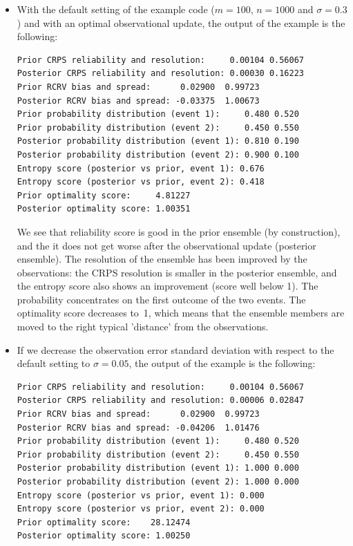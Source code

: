 \documentclass[11pt]{article}
\begin{document}
\begin{itemize}
\item
With the default setting of the example code
($m=100$, $n=1000$ and $\sigma=0.3$)
and with an optimal observational update,
the output of the example is the following:

\begin{verbatim}
Prior CRPS reliability and resolution:     0.00104 0.56067
Posterior CRPS reliability and resolution: 0.00030 0.16223
Prior RCRV bias and spread:      0.02900  0.99723
Posterior RCRV bias and spread: -0.03375  1.00673
Prior probability distribution (event 1):     0.480 0.520
Prior probability distribution (event 2):     0.450 0.550
Posterior probability distribution (event 1): 0.810 0.190
Posterior probability distribution (event 2): 0.900 0.100
Entropy score (posterior vs prior, event 1): 0.676
Entropy score (posterior vs prior, event 2): 0.418
Prior optimality score:     4.81227
Posterior optimality score: 1.00351
\end{verbatim}

We see that reliability score is good in the prior ensemble (by construction),
and the it does not get worse after the observational update (posterior ensemble).
The resolution of the ensemble has been improved by the observations:
the CRPS resolution is smaller in the posterior ensemble,
and the entropy score also shows an improvement (score well below 1).
The probability concentrates on the first outcome of the two events.
The optimality score decreases to~1, which means that the ensemble members
are moved to the right typical 'distance' from the observations.

\item
If we decrease the observation error standard deviation
with respect to the default setting to $\sigma=0.05$,
the output of the example is the following:

\begin{verbatim}
Prior CRPS reliability and resolution:     0.00104 0.56067
Posterior CRPS reliability and resolution: 0.00006 0.02847
Prior RCRV bias and spread:      0.02900  0.99723
Posterior RCRV bias and spread: -0.04206  1.01476
Prior probability distribution (event 1):     0.480 0.520
Prior probability distribution (event 2):     0.450 0.550
Posterior probability distribution (event 1): 1.000 0.000
Posterior probability distribution (event 2): 1.000 0.000
Entropy score (posterior vs prior, event 1): 0.000
Entropy score (posterior vs prior, event 2): 0.000
Prior optimality score:    28.12474
Posterior optimality score: 1.00250
\end{verbatim}


\end{itemize}
\end{document}
